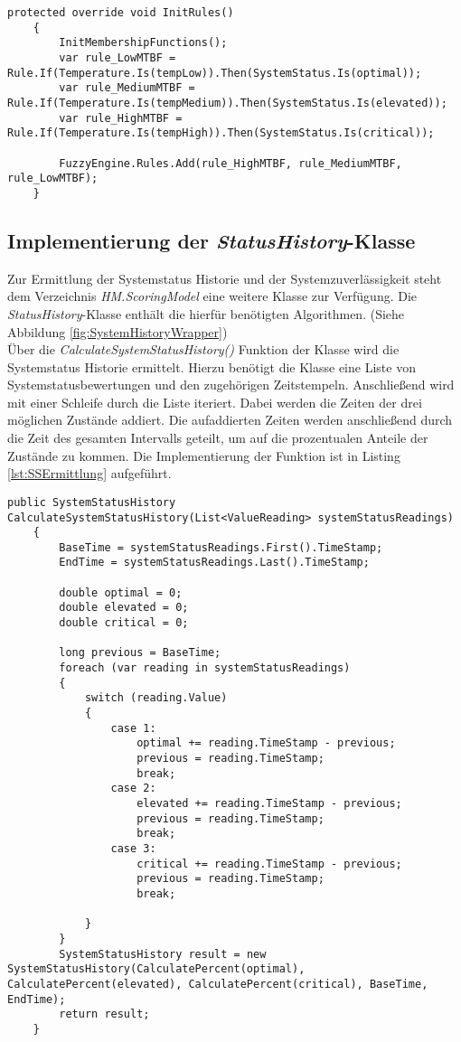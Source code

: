 \begin{lstlisting}[caption={Implementierung des Regelwerks}, label={lst:RBFuzzy}]
    protected override void InitRules()
    {
        InitMembershipFunctions();
        var rule_LowMTBF = Rule.If(Temperature.Is(tempLow)).Then(SystemStatus.Is(optimal));
        var rule_MediumMTBF = Rule.If(Temperature.Is(tempMedium)).Then(SystemStatus.Is(elevated));
        var rule_HighMTBF = Rule.If(Temperature.Is(tempHigh)).Then(SystemStatus.Is(critical));

        FuzzyEngine.Rules.Add(rule_HighMTBF, rule_MediumMTBF, rule_LowMTBF);
    }\end{lstlisting}

\subsection{Implementierung der \textit{StatusHistory}-Klasse}
Zur Ermittlung der Systemstatus Historie und der Systemzuverlässigkeit steht dem Verzeichnis \textit{HM.ScoringModel} eine weitere Klasse zur Verfügung. Die \textit{StatusHistory}-Klasse enthält die hierfür benötigten Algorithmen. (Siehe Abbildung \ref{fig:SystemHistoryWrapper})\\
Über die \textit{CalculateSystemStatusHistory()} Funktion der Klasse wird die Systemstatus Historie ermittelt. Hierzu benötigt die Klasse eine Liste von Systemstatusbewertungen und den zugehörigen Zeitstempeln. Anschließend wird mit einer Schleife durch die Liste iteriert. Dabei werden die Zeiten der drei möglichen Zustände addiert. Die aufaddierten Zeiten werden anschließend durch die Zeit des gesamten Intervalls geteilt, um auf die prozentualen Anteile der Zustände zu kommen. Die Implementierung der Funktion ist in Listing \ref{lst:SSErmittlung} aufgeführt.\\
\begin{lstlisting}[caption={Implementierung der Systemstatus Historie Ermittlung}, label={lst:SSErmittlung}]
    public SystemStatusHistory CalculateSystemStatusHistory(List<ValueReading> systemStatusReadings)
    {
        BaseTime = systemStatusReadings.First().TimeStamp;
        EndTime = systemStatusReadings.Last().TimeStamp;

        double optimal = 0;
        double elevated = 0;
        double critical = 0;

        long previous = BaseTime;
        foreach (var reading in systemStatusReadings)
        {
            switch (reading.Value)
            {
                case 1:
                    optimal += reading.TimeStamp - previous;
                    previous = reading.TimeStamp;
                    break;
                case 2:
                    elevated += reading.TimeStamp - previous;
                    previous = reading.TimeStamp;
                    break;
                case 3:
                    critical += reading.TimeStamp - previous;
                    previous = reading.TimeStamp;
                    break;

            }
        }
        SystemStatusHistory result = new SystemStatusHistory(CalculatePercent(optimal), CalculatePercent(elevated), CalculatePercent(critical), BaseTime, EndTime);
        return result;
    }\end{lstlisting}

